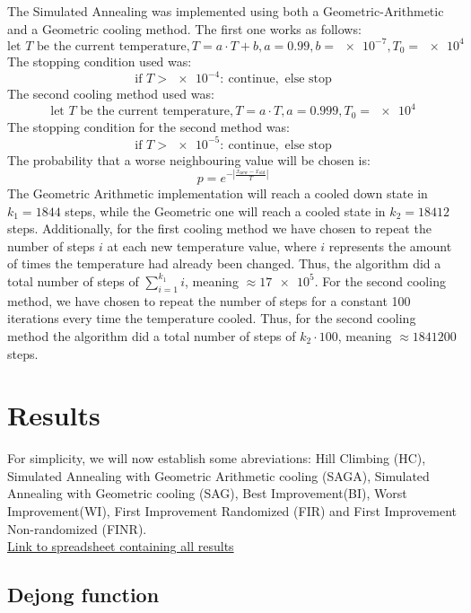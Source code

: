 \documentclass{article}
\newcommand{\euler}{e}
\begin{document}
The Simulated Annealing was implemented using both a Geometric-Arithmetic and a Geometric cooling method. The first one works as follows:
$$ \text{let } T \text{ be the current temperature}, T = a \cdot T + b, a = 0.99, b = \num{e-7}, T_0 = \num{e4} $$
The stopping condition used was:
$$ \text{if } T > \num{e-4}\colon\  \text{continue}, \text{ else stop} $$
The second cooling method used was:
$$ \text{let } T \text{ be the current temperature}, T = a \cdot T, a = 0.999, T_0 = \num{e4} $$
The stopping condition for the second method was:
$$ \text{if } T > \num{e-5}\colon\  \text{continue}, \text{ else stop} $$
The probability that a worse neighbouring value will be chosen is: 
$$p = \euler^{-|\frac{x_{\text{new}} - x_{\text{old}}}{T}|}$$
The Geometric Arithmetic implementation will reach a cooled down state in $ k_1 = 1844 $ steps, while the Geometric one will reach a cooled state in $ k_2 = 18412 $ steps. Additionally, for the first cooling method we have chosen to repeat the number of steps $i$ at each new temperature value, where $i$ represents the amount of times the temperature had already been changed. Thus, the algorithm did a total number of steps of $ \sum_{i = 1}^{k_1} i $, meaning $\approx \num{17e5} $. For the second cooling method, we have chosen to repeat the number of steps for a constant 100 iterations every time the temperature cooled. Thus, for the second cooling method the algorithm did a total number of steps of $k_2 \cdot 100$, meaning $\approx 1841200 $ steps.

\section{Results}

For simplicity, we will now establish some abreviations: Hill Climbing (HC), Simulated Annealing with Geometric Arithmetic cooling (SAGA), Simulated Annealing with Geometric cooling (SAG), Best Improvement(BI), Worst Improvement(WI), First Improvement Randomized (FIR) and First Improvement Non-randomized (FINR). \\

\href{./H1Improved.xlsx}{Link to spreadsheet containing all results}

\subsection{Dejong function}
\end{document}

